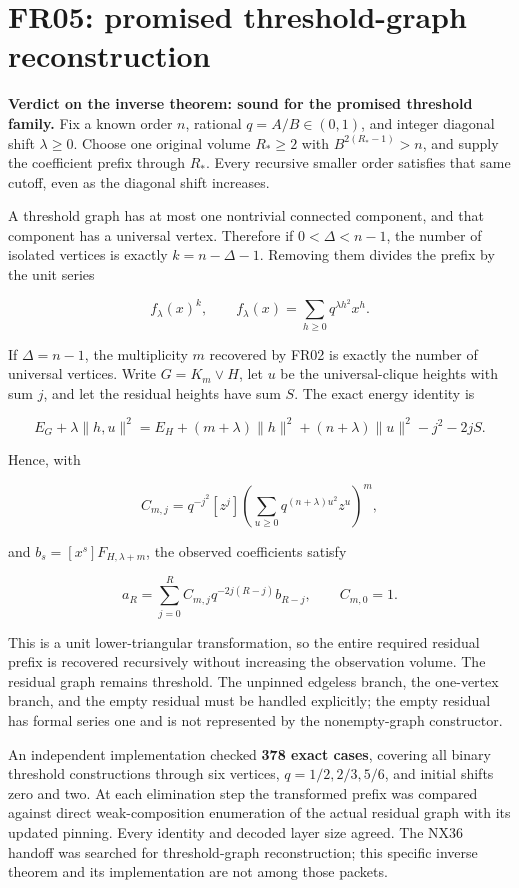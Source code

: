 \documentclass[
  11pt,
  a4paper,
]{report}
\begin{document}
\hypertarget{fr05-promised-threshold-graph-reconstruction}{%
\section{FR05: promised threshold-graph
reconstruction}\label{fr05-promised-threshold-graph-reconstruction}}

\textbf{Verdict on the inverse theorem: sound for the promised threshold
family.} Fix a known order \(n\), rational \(q=A/B\in(0,1)\), and
integer diagonal shift \(\lambda\ge0\). Choose one original volume
\(R_*\ge2\) with \(B^{2(R_*-1)}>n\), and supply the coefficient prefix
through \(R_*\). Every recursive smaller order satisfies that same
cutoff, even as the diagonal shift increases.

A threshold graph has at most one nontrivial connected component, and
that component has a universal vertex. Therefore if \(0<\Delta<n-1\),
the number of isolated vertices is exactly \(k=n-\Delta-1\). Removing
them divides the prefix by the unit series

\[
 f_\lambda(x)^k,\qquad f_\lambda(x)=\sum_{h\ge0}q^{\lambda h^2}x^h.
\]

If \(\Delta=n-1\), the multiplicity \(m\) recovered by FR02 is exactly
the number of universal vertices. Write \(G=K_m\vee H\), let \(u\) be
the universal-clique heights with sum \(j\), and let the residual
heights have sum \(S\). The exact energy identity is

\[
 E_G+\lambda\|h,u\|^2
 =E_H+(m+\lambda)\|h\|^2
 +(n+\lambda)\|u\|^2-j^2-2jS.
\]

Hence, with

\[
 C_{m,j}=q^{-j^2}[z^j]
 \left(\sum_{u\ge0}q^{(n+\lambda)u^2}z^u\right)^m,
\]

and \(b_s=[x^s]F_{H,\lambda+m}\), the observed coefficients satisfy

\[
 a_R=\sum_{j=0}^R C_{m,j}q^{-2j(R-j)}b_{R-j},\qquad C_{m,0}=1.
\]

This is a unit lower-triangular transformation, so the entire required
residual prefix is recovered recursively without increasing the
observation volume. The residual graph remains threshold. The unpinned
edgeless branch, the one-vertex branch, and the empty residual must be
handled explicitly; the empty residual has formal series one and is not
represented by the nonempty-graph constructor.

An independent implementation checked \textbf{378 exact cases}, covering
all binary threshold constructions through six vertices,
\(q=1/2,2/3,5/6\), and initial shifts zero and two. At each elimination
step the transformed prefix was compared against direct weak-composition
enumeration of the actual residual graph with its updated pinning. Every
identity and decoded layer size agreed. The NX36 handoff was searched
for threshold-graph reconstruction; this specific inverse theorem and
its implementation are not among those packets.
\end{document}

